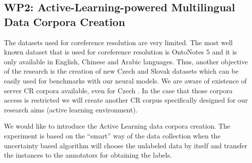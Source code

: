 \subsection*{WP2: Active-Learning-powered Multilingual Data Corpora Creation}

 The datasets used for coreference resolution are very limited. The most well known dataset that is used for coreference resolution is OntoNotes 5 \cite{ontonotes5-Weischedel2013} and it is only available in English, Chinese and Arabic languages. {\color{red}
 Thus, another objective of the research is the creation of new Czech and Slovak datasets which can be easily used for benchmarks with our neural models.
 We are aware of existence of server CR corpora available, even for Czech \cite{cr-mult-Nedoluzhko2021}. 
 In the case that those corpora access is restricted we will create another CR corpus specifically designed for our research aims (active learning environment).  
 }

We would like to introduce the Active Learning data corpora creation. The experiment is based on the “smart” way of the data collection when the uncertainty based algorithm will choose the unlabeled data by itself and transfer the instances to the annotators for obtaining the labels. 

